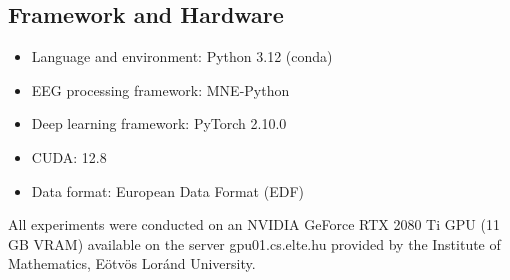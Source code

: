 \subsection{Framework and Hardware}

\begin{itemize}
    \item Language and environment: Python 3.12 (conda)
    \item EEG processing framework: MNE-Python
    \item Deep learning framework: PyTorch 2.10.0
    \item CUDA: 12.8
    \item Data format: European Data Format (EDF)
\end{itemize}

All experiments were conducted on an NVIDIA GeForce RTX 2080 Ti GPU (11 GB VRAM) available on the server gpu01.cs.elte.hu provided by the Institute of Mathematics, Eötvös Loránd University.
